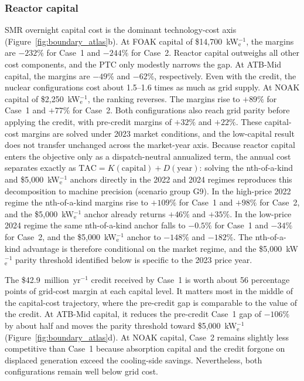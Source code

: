 \documentclass[a4paper,fleqn]{cas-sc}
\begin{document}
\subsubsection{Reactor capital}
SMR overnight capital cost is the dominant technology-cost axis (Figure~\ref{fig:boundary_atlas}b). At FOAK capital of \$14{,}700~kW$_\mathrm{e}^{-1}$, the margins are $-232\%$ for Case~1 and $-244\%$ for Case~2. Reactor capital outweighs all other cost components, and the PTC only modestly narrows the gap. At ATB-Mid capital, the margins are $-49\%$ and $-62\%$, respectively. Even with the credit, the nuclear configurations cost about 1.5--1.6 times as much as grid supply. At NOAK capital of \$2{,}250~kW$_\mathrm{e}^{-1}$, the ranking reverses. The margins rise to $+89\%$ for Case~1 and $+77\%$ for Case~2. Both configurations also reach grid parity before applying the credit, with pre-credit margins of $+32\%$ and $+22\%$. These capital-cost margins are solved under 2023 market conditions, and the low-capital result does not transfer unchanged across the market-year axis. Because reactor capital enters the objective only as a dispatch-neutral annualized term, the annual cost separates exactly as $\mathrm{TAC} = K(\mathrm{capital}) + D(\mathrm{year})$: solving the nth-of-a-kind and \$5{,}000~kW$_\mathrm{e}^{-1}$ anchors directly in the 2022 and 2024 regimes reproduces this decomposition to machine precision (scenario group G9). In the high-price 2022 regime the nth-of-a-kind margins rise to $+109\%$ for Case~1 and $+98\%$ for Case~2, and the \$5{,}000~kW$_\mathrm{e}^{-1}$ anchor already returns $+46\%$ and $+35\%$. In the low-price 2024 regime the same nth-of-a-kind anchor falls to $-0.5\%$ for Case~1 and $-34\%$ for Case~2, and the \$5{,}000~kW$_\mathrm{e}^{-1}$ anchor to $-148\%$ and $-182\%$. The nth-of-a-kind advantage is therefore conditional on the market regime, and the \$5{,}000~kW$_\mathrm{e}^{-1}$ parity threshold identified below is specific to the 2023 price year.

The \$42.9~million~yr$^{-1}$ credit received by Case~1 is worth about 56 percentage points of grid-cost margin at each capital level. It matters most in the middle of the capital-cost trajectory, where the pre-credit gap is comparable to the value of the credit. At ATB-Mid capital, it reduces the pre-credit Case~1 gap of $-106\%$ by about half and moves the parity threshold toward \$5{,}000~kW$_\mathrm{e}^{-1}$ (Figure~\ref{fig:boundary_atlas}d). At NOAK capital, Case~2 remains slightly less competitive than Case~1 because absorption capital and the credit forgone on displaced generation exceed the cooling-side savings. Nevertheless, both configurations remain well below grid cost.
\end{document}
